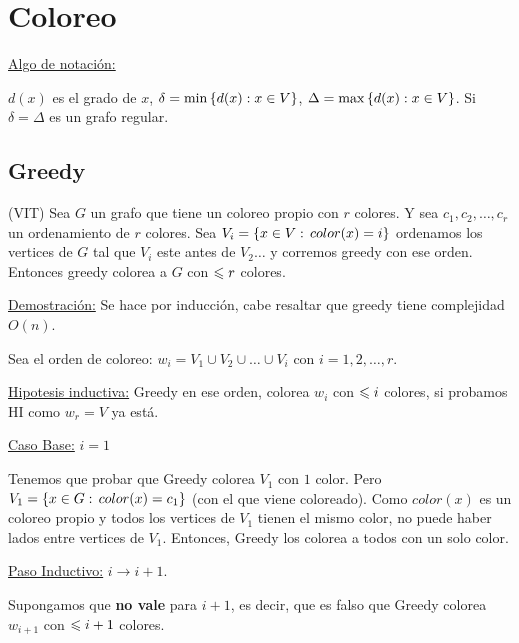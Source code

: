 \documentclass[12pt,a4paper]{article}
\begin{document}
\maketitle{}

\tableofcontents

\section{Coloreo}
\underline{Algo de notación:}
\medskip

$d(x)$ es el grado de $x$, $\delta = \min \left\lbrace d(x):x\in V \right\rbrace$, $\Delta = \max \left\lbrace d(x):x\in V \right\rbrace$.
Si $\delta = \Delta$ es un grafo regular.

\subsection{Greedy}

\begin{teorema}(VIT) Sea $G$ un grafo que tiene un coloreo propio con $r$ colores. Y 
    sea $c_{1},c_{2},\ldots,c_{r}$ un ordenamiento de $r$ colores. Sea $V_{i} = \left\lbrace x\in V :\, color(x)=i \right\rbrace$
    ordenamos los vertices de $G$ tal que $V_{i}$ este antes de $V_{2}\ldots$ y corremos 
    greedy con ese orden. Entonces greedy colorea a $G$ con $\leqslant r$ colores.
\end{teorema}
\underline{Demostración:} Se hace por inducción, cabe resaltar que greedy tiene 
complejidad $O(n)$.
\medskip

Sea el orden de coloreo: $w_{i} = V_{1} \cup V_{2} \cup \ldots \cup V_{i}$ con  $i=1,2,\ldots,r$.
\medskip

\underline{Hipotesis inductiva:} Greedy en ese orden, colorea $w_{i}$ con $\leqslant i$ colores, si 
probamos HI como $w_{r} = V$ ya está.
\medskip

\underline{Caso Base:} $i=1$
\medskip

Tenemos que probar que Greedy colorea $V_{1}$ con $1$ color. Pero 
$V_{1} = \left\lbrace x \in G : \, color(x) = c_{1} \right\rbrace$ (con el que viene coloreado). 
Como $color(x)$ es un coloreo propio y todos los vertices de $V_{1}$ tienen el 
mismo color, no puede haber lados entre vertices de $V_{1}$. Entonces, Greedy los 
colorea a todos con un solo color.
\medskip

\underline{Paso Inductivo:} $i \rightarrow i+1$.
\medskip

Supongamos que \textbf{no vale} para $i+1$, es decir, que es falso que Greedy colorea $w_{i+1}$ 
con $\leqslant i+1$ colores.
\medskip
\end{document}
